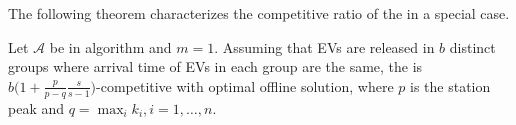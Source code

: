 \begin{comment}
Let $\mathcal{S}_{\iocs,t}$ and $\mathcal{S}_{\opt,t}$ be set of active EVs at time slot $t$ that are selected for charging by \iocs and \opt (fix a particular optimal solution), respectively. Note that the set of active EVs for \iocs and \opt might be different. 
Having $i\in\mathcal{S}_{\iocs,t}$ means that based on the updated schedule at time slot $t$, enough resources reserved for EV $i$ so that the EV will receive its demand $D_i$ before the deadline $d_i$. However, the schedule may change at each slot and $i\in\mathcal{S}_{\iocs,t}$ cannot be a guarantee for EV $i$ to fully receive its demand. In fact, users and the scheduler itself have to wait until the deadline of the EV to find out that the demand is fulfilled or not. This is because the scheduler may cancel some reservations in the next time slots and allocate the freed resources to other EVs.
\end{comment}

The following theorem characterizes the competitive ratio of the \iocs in a special case. 
\begin{thm}
\label{thm:iocscompetitive}
Let $\mathcal{A}$ be \ics in \iocs algorithm and $m=1$. Assuming that EVs are released in $b$ distinct groups where arrival time of EVs in each group are the same, the \iocs is $b\Big(1+\frac{p}{p-q}\frac{s}{s-1}\Big)$-competitive with optimal offline solution, where $p$ is the station peak and $q=\max_i k_i, i=1,\dots ,n$. 
\end{thm}


		
		
